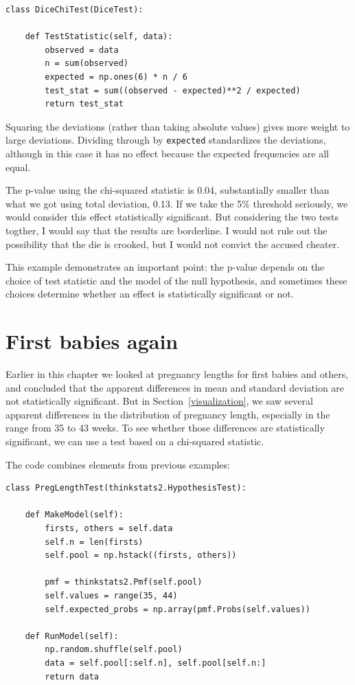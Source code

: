 \documentclass[12pt]{book}
\theoremstyle{exercise}
\begin{document}
\begin{verbatim}
class DiceChiTest(DiceTest):

    def TestStatistic(self, data):
        observed = data
        n = sum(observed)
        expected = np.ones(6) * n / 6
        test_stat = sum((observed - expected)**2 / expected)
        return test_stat
\end{verbatim}

Squaring the deviations (rather than taking absolute values) gives
more weight to large deviations.  Dividing through by {\tt expected}
standardizes the deviations, although in this case it has no effect
because the expected frequencies are all equal.%

The p-value using the chi-squared statistic is 0.04,
substantially smaller than what we got using total deviation, 0.13.
If we take the 5\% threshold seriously, we would consider this effect
statistically significant.  But considering the two tests togther, I
would say that the results are borderline.  I would not rule out the
possibility that the die is crooked, but I would not convict the
accused cheater.%
%
%

This example demonstrates an important point: the p-value depends
on the choice of test statistic and the model of the null hypothesis,
and sometimes these choices determine whether an effect is
statistically significant or not.%
%


\section{First babies again}

Earlier in this chapter we looked at pregnancy lengths for first
babies and others, and concluded that the apparent differences in
mean and standard deviation are not statistically significant.  But in
Section~\ref{visualization}, we saw several apparent differences
in the distribution of pregnancy length, especially in the range from
35 to 43 weeks.  To see whether those differences are statistically
significant, we can use a test based on a chi-squared statistic.%
%
%
%

The code combines elements from previous examples:%

\begin{verbatim}
class PregLengthTest(thinkstats2.HypothesisTest):

    def MakeModel(self):
        firsts, others = self.data
        self.n = len(firsts)
        self.pool = np.hstack((firsts, others))

        pmf = thinkstats2.Pmf(self.pool)
        self.values = range(35, 44)
        self.expected_probs = np.array(pmf.Probs(self.values))

    def RunModel(self):
        np.random.shuffle(self.pool)
        data = self.pool[:self.n], self.pool[self.n:]
        return data
\end{verbatim}
\end{document}
